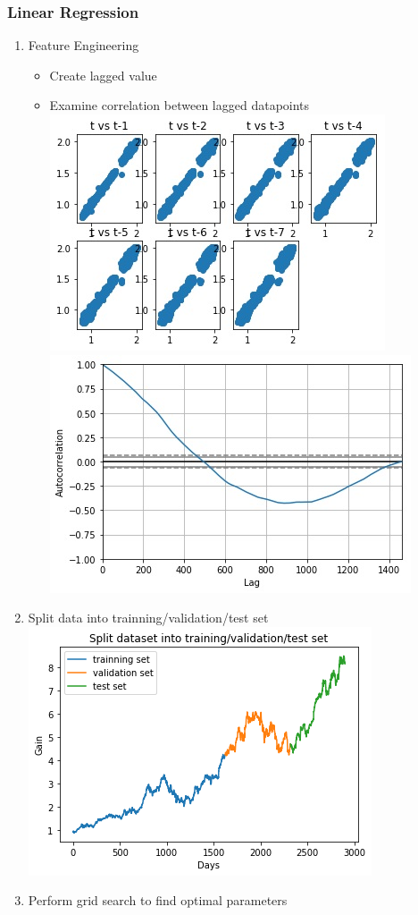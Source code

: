 \documentclass[11pt]{article}
\makeatletter
\def\maxwidth{\ifdim\Gin@nat@width>\linewidth\linewidth
    \else\Gin@nat@width\fi}
\let\Oldincludegraphics\includegraphics
\renewcommand{\includegraphics}[1]{\Oldincludegraphics[width=.8\maxwidth]{#1}}
\providecommand{\tightlist}{%
      \setlength{\itemsep}{0pt}\setlength{\parskip}{0pt}}
\makeatother
\begin{document}
\subsubsection{Linear Regression}\label{linear-regression}

\begin{enumerate}
\def\labelenumi{\arabic{enumi}.}
\item
  Feature Engineering

  \begin{itemize}
  \tightlist
  \item
    Create lagged value
  \item
    Examine correlation between lagged datapoints
    \includegraphics{./figures/14.jpg}
    \includegraphics{./figures/15.jpg}
  \end{itemize}
\item
  Split data into trainning/validation/test set
  \includegraphics{./figures/16.jpg}
\item
  Perform grid search to find optimal parameters


\end{enumerate}
\end{document}
